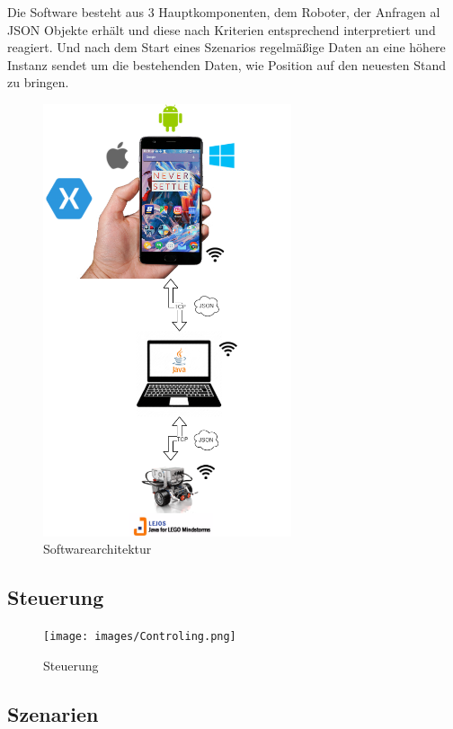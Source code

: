 Die Software besteht aus 3 Hauptkomponenten, dem Roboter, der Anfragen al JSON Objekte erhält und diese nach Kriterien entsprechend interpretiert und reagiert. Und nach dem Start eines Szenarios regelmäßige Daten an eine höhere Instanz sendet um die bestehenden Daten, wie Position auf den neuesten Stand zu bringen. 

\newpage
\begin{figure}[h]
	\centering
	\includegraphics[width=0.65\textwidth]{images/konzeption/Softwarearchitecture.png}
	\caption{Softwarearchitektur}
	\label{fig:softwarearchitecture}
\end{figure}

\newpage
\subsection{Steuerung}

\begin{figure}[h]
	\centering
	\texttt{[image: images/Controling.png]}
	\caption{Steuerung}
	\label{fig:steuerung}
\end{figure}

\subsection{Szenarien}


